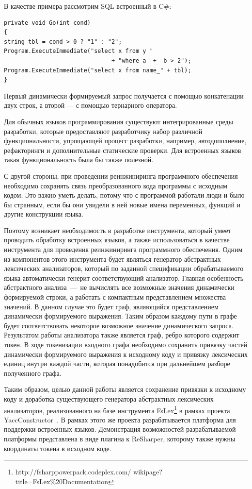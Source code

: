 В качестве примера рассмотрим SQL встроенный в C\#:

\begin{verbatim}
private void Go(int cond)
{
string tbl = cond > 0 ? "1" : "2";
Program.ExecuteImmediate("select x from y " 
                               + "where a  +  b > 2");
Program.ExecuteImmediate("select x from name_" + tbl);
}
\end{verbatim}

Первый динамически формируемый запрос получается с помощью конкатенации двух строк, а второй --- с помощью тернарного оператора.

Для обычных языков программирования существуют интегрированные среды разработки, которые предоставляют разработчику набор различной 
функциональности, упрощающей процесс разработки, например, автодополнение, рефакторинги и дополнительные статические проверки.
Для встроенных языков такая функциональность была бы также полезной.

С другой стороны, при проведении реинжиниринга программного обеспечения необходимо сохранять связь преобразованного кода программы
с исходным кодом.  Это важно уметь делать, потому что с  программой работали люди и было бы странным, если бы они увидели в ней новые 
имена переменных, функций и другие конструкции языка.  

Поэтому возникает необходимость в разработке инструмента, который умеет проводить обработку встроенных языков, а также использоваться
в качестве инструмента для проведения реинжиниринга программного обеспечения. Одним из компонентов этого инструмента будет 
являться генератор абстрактных лексических анализаторов, который по заданной спецификации обрабатываемого языка автоматически генерит 
соответствующий  анализатор. Главная особенность абстрактного анализа~---~не вычислять все возможные значения динамически формируемой 
строки, а работать с компактным представлением множества значений.   В данном случае это будет граф, являющийся представлением динамически 
формируемого выражения.  Таким образом каждому пути в графе будет соответствовать некоторое возможное значение динамического запроса.
Результатом работы анализатора также является граф, ребро которого содержит токен. В ходе токенизации входного графа необходимо сохранить 
привязку частей динамически формируемого выражения к исходному коду и привязку лексических единиц внутри каждой части, которая понадобится 
при дальнейшем разборе полученного графа. 

Таким образом, целью данной работы является сохранение привязки к исходному коду и доработка существующего генератора абстрактных лексических 
анализаторов, реализованного на базе инструмента FsLex\footnote{http://fsharppowerpack.codeplex.com/ wikipage?title=FsLex\%20Documentation} 
в рамках проекта YaccConstructor~\cite{YC_article}. В рамках этого же проекта разрабатывается платформа для поддержки встроенных языков. 
Демонстрация возможностей разрабатываемой платформы представлена в виде плагина к ReSharper, которому также нужны координаты токена в 
исходном коде. 

